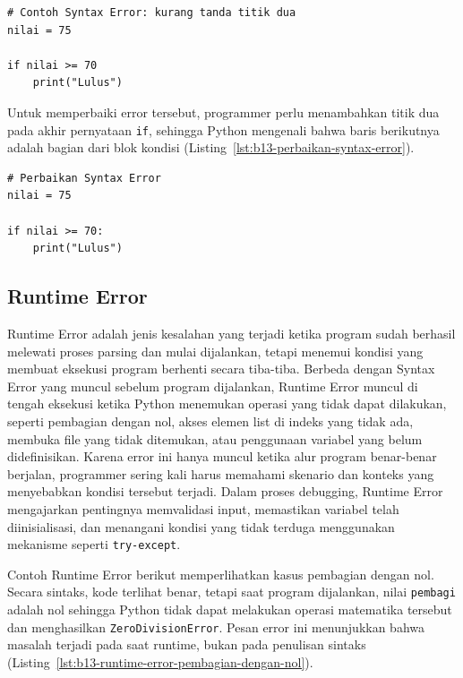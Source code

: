 \begin{lstlisting}[style=PythonStyle, caption={Contoh Syntax Error: kurang tanda titik dua}, label={lst:b13-syntax-error-kurang-tanda-titik-dua}]
# Contoh Syntax Error: kurang tanda titik dua
nilai = 75

if nilai >= 70
    print("Lulus")
\end{lstlisting}

Untuk memperbaiki error tersebut, programmer perlu menambahkan titik dua pada akhir pernyataan \texttt{if}, sehingga Python mengenali bahwa baris berikutnya adalah bagian dari blok kondisi (Listing~\ref{lst:b13-perbaikan-syntax-error}).

\begin{lstlisting}[style=PythonStyle, caption={Perbaikan Syntax Error}, label={lst:b13-perbaikan-syntax-error}]
# Perbaikan Syntax Error
nilai = 75

if nilai >= 70:
    print("Lulus")
\end{lstlisting}

\subsection{Runtime Error}

Runtime Error adalah jenis kesalahan yang terjadi ketika program sudah berhasil melewati proses parsing dan mulai dijalankan, tetapi menemui kondisi yang membuat eksekusi program berhenti secara tiba-tiba. Berbeda dengan Syntax Error yang muncul sebelum program dijalankan, Runtime Error muncul di tengah eksekusi ketika Python menemukan operasi yang tidak dapat dilakukan, seperti pembagian dengan nol, akses elemen list di indeks yang tidak ada, membuka file yang tidak ditemukan, atau penggunaan variabel yang belum didefinisikan. Karena error ini hanya muncul ketika alur program benar-benar berjalan, programmer sering kali harus memahami skenario dan konteks yang menyebabkan kondisi tersebut terjadi. Dalam proses debugging, Runtime Error mengajarkan pentingnya memvalidasi input, memastikan variabel telah diinisialisasi, dan menangani kondisi yang tidak terduga menggunakan mekanisme seperti \texttt{try-except}.

Contoh Runtime Error berikut memperlihatkan kasus pembagian dengan nol. Secara sintaks, kode terlihat benar, tetapi saat program dijalankan, nilai \texttt{pembagi} adalah nol sehingga Python tidak dapat melakukan operasi matematika tersebut dan menghasilkan \texttt{ZeroDivisionError}. Pesan error ini menunjukkan bahwa masalah terjadi pada saat runtime, bukan pada penulisan sintaks (Listing~\ref{lst:b13-runtime-error-pembagian-dengan-nol}).

